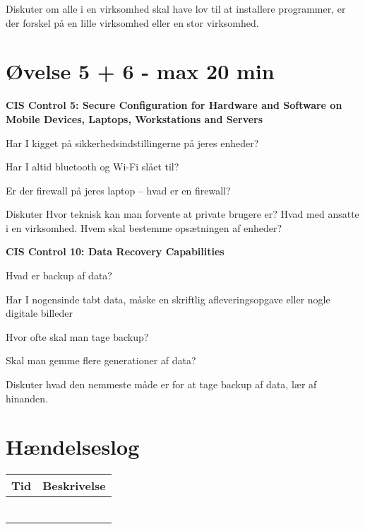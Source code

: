 \documentclass[a4paper,11pt,notitlepage,landscape]{report}
\begin{document}
Diskuter om alle i en virksomhed skal have lov til at installere programmer, er der forskel på en lille virksomhed eller en stor virksomhed.

\eject

\section*{Øvelse 5 + 6 - max 20 min}

{\bf CIS Control 5:
Secure Configuration for Hardware and Software on Mobile Devices, Laptops, Workstations and Servers}

\begin{list1}
\item[\faSquareO] Har I kigget på sikkerhedsindstillingerne på jeres enheder?
\item[\faSquareO] Har I altid bluetooth og Wi-Fi slået til?

\item[\faSquareO] Er der firewall på jeres laptop -- hvad er en firewall?
\end{list1}

Diskuter Hvor teknisk kan man forvente at private brugere er? Hvad med ansatte i en virksomhed. Hvem skal bestemme opsætningen af enheder?

\eject

{\bf CIS Control 10: Data Recovery Capabilities}

\begin{list1}
\item[\faSquareO] Hvad er backup af data?
\item[\faSquareO] Har I nogensinde tabt data, måske en skriftlig afleveringsopgave eller nogle digitale billeder
\item[\faSquareO] Hvor ofte skal man tage backup?
\item[\faSquareO] Skal man gemme flere generationer af data?
\end{list1}

Diskuter hvad den nemmeste måde er for at tage backup af data, lær af hinanden.


\eject

\section*{Hændelseslog }


\begin{tabularx}{\textwidth-1cm}{|p{3cm}|X|} \hline
Tid & Beskrivelse \\\hline
& \\\hline
& \\\hline
& \\\hline
& \\\hline
& \\\hline
& \\\hline
\end{tabularx}
\end{document}
